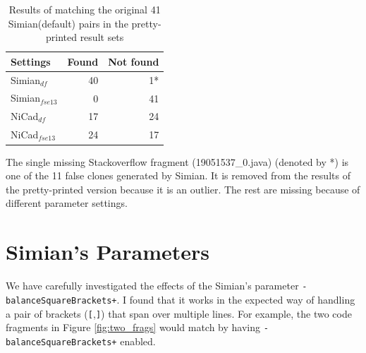 \documentclass{IEEEtran}
\begin{document}
\begin{table}[H]
	\centering
	\caption{Results of matching the original 41 Simian(default) pairs in the pretty-printed result sets}
	\label{tab:search}
	\begin{tabular}{l|r|r}
		\hline 
		Settings & Found & Not found \\ 
		\hline 
		Simian$_{\mathrm{\textit{df}}}$  &  40 & 1* \\ 
		\hline 
		Simian$_{\mathrm{\textit{fse13}}}$ & 0 & 41  \\ 
		\hline 
		NiCad$_{\mathrm{\textit{df}}}$  & 17 & 24 \\ 
		\hline 
		NiCad$_{\mathrm{\textit{fse13}}}$ &  24 & 17 \\ 
		\hline 
	\end{tabular} 
\end{table}

The single missing Stackoverflow fragment (19051537\_0.java) (denoted by *) is one of the 11 false clones generated by Simian. It is removed from the results of the pretty-printed version because it is an outlier. The rest are missing because of different parameter settings.

\section*{Simian's Parameters}

We have carefully investigated the effects of the Simian's parameter \texttt{-balanceSquareBrackets+}. I found that it works in the expected way of handling a pair of brackets (\texttt{[},\texttt{]}) that span over multiple lines. For example, the two code fragments in Figure \ref{fig:two_frags} would match by having \texttt{-balanceSquareBrackets+} enabled.
\end{document}
